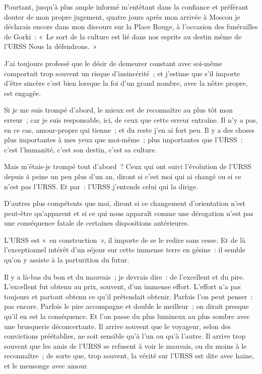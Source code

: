 \documentclass[twoside]{book} %
\begin{document}
\noindent Pourtant, jusqu’à plus ample informé m’entêtant dans la confiance et préférant douter de mon propre jugement, quatre jours après mon arrivée à Moscou je déclarais encore dans mon discours sur la Place Rouge, à l’occasion des funérailles de Gorki : « Le sort de la culture est lié dans nos esprits au destin même de l’URSS Nous la défendrons. »\par
J’ai toujours professé que le désir de demeurer constant avec soi-même comportait trop souvent un risque d’insincérité ; et j’estime que s’il importe d’être sincère c’est bien lorsque la foi d’un grand nombre, avec la nôtre propre, est engagée.\par
Si je me suis trompé d’abord, le mieux est de reconnaître au plus tôt mon erreur ; car je suis responsable, ici, de ceux que cette erreur entraîne. Il n’y a pas, en ce cas, amour-propre qui tienne ; et du reste j’en ai fort peu. Il y a des choses plus importantes à mes yeux que moi-même ; plus importantes que l’URSS : c’est l’humanité, c’est son destin, c’est sa culture.\par
Mais m’étais-je trompé tout d’abord ? Ceux qui ont suivi l’évolution de l’URSS depuis à peine un peu plus d’un an, diront si c’est moi qui ai changé ou si ce n’est pas l’URSS. Et par : l’URSS j’entends celui qui la dirige.\par
D’autres plus compétents que moi, diront si ce changement d’orientation n’est peut-être qu’apparent et si ce qui nous apparaît comme une dérogation n’est pas une conséquence fatale de certaines dispositions antérieures.\par
L’URSS est « en construction », il importe de se le redire sans cesse. Et de là l’exceptionnel intérêt d’un séjour sur cette immense terre en gésine : il semble qu’on y assiste à la parturition du futur.\par
Il y a là-bas du bon et du mauvais ; je devrais dire : de l’excellent et du pire. L’excellent fut obtenu au prix, souvent, d’un immense effort. L’effort n’a pas toujours et partout obtenu ce qu’il prétendait obtenir. Parfois l’on peut penser : pas encore. Parfois le pire accompagne et double le meilleur ; on dirait presque qu’il en est la conséquence. Et l’on passe du plus lumineux au plus sombre avec une brusquerie déconcertante. Il arrive souvent que le voyageur, selon des convictions préétablies, ne soit sensible qu’à l’un ou qu’à l’autre. Il arrive trop souvent que les amis de l’URSS se refusent à voir le mauvais, ou du moins à le reconnaître ; de sorte que, trop souvent, la vérité sur l’URSS est dite avec haine, et le mensonge avec amour.\par
\end{document}
